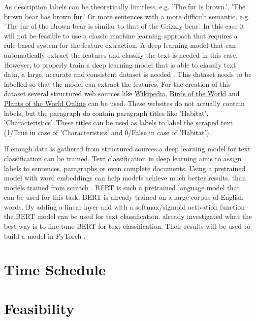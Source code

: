 \documentclass{article}
\begin{document}
As description labels can be theoretically limitless, e.g. 'The fur is brown.', 'The brown bear has brown fur.'
Or more sentences with a more difficult semantic, e.g. 'The fur of the Brown bear is similar to that of the Grizzly bear'.
In this case it will not be feasible to use a classic machine learning approach that requires a rule-based system for the feature extraction. 
A deep learning model that can automatically extract the features and classify the text is needed in this case.
However, to properly train a deep learning model that is able to classify text data, a large, accurate and consistent dataset is needed \cite{munappy_data_2019}.
This dataset needs to be labelled so that the model can extract the features.
For the creation of this dataset several structured web sources like \href{http://www.Wikipedia.com}{Wikipedia}, \href{https://birdsoftheworld.org}{Birds of the World} and \href{http://powo.science.kew.org/}{Plants of the World Online} can be used.
These websites do not actually contain labels, but the paragraph do contain paragraph titles like 'Habitat', 'Characteristics'. 
These titles can be used as labels to label the scraped text (1/True in case of 'Characteristics' and 0/False in case of 'Habitat').

If enough data is gathered from structured sources a deep learning model for text classification can be trained.
Text classification in deep learning aims to assign labels to sentences, paragraphs or even complete documents. 
Using a pretrained model with word embeddings can help models achieve much better results, than models trained from scratch \cite{mikolov_distributed_2013}.  
BERT \cite{devlin_bert_2019} is such a pretrained language model that can be used for this task.
BERT is already trained on a large corpus of English words.
By adding a linear layer and with a softmax/sigmoid activation function the BERT model can be used for text classification.
\cite{sun_how_2020} already investigated what the best way is to fine tune BERT for text classification. 
Their results will be used to build a model in PyTorch \cite{paszke_pytorch_2019}.




\section{Time Schedule}
\section{Feasibility}

\printbibliography
\end{document}
